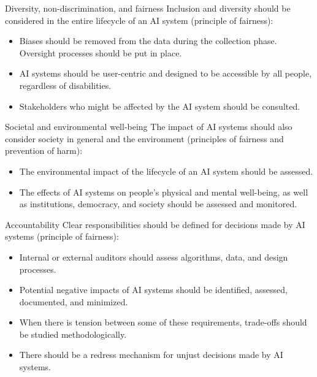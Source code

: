 \begin{descriptionlist}
    \item[Diversity, non-discrimination, and fairness] 
        Inclusion and diversity should be considered in the entire lifecycle of an AI system (principle of fairness):
        \begin{itemize}
            \item Biases should be removed from the data during the collection phase. Oversight processes should be put in place.
            \item AI systems should be user-centric and designed to be accessible by all people, regardless of disabilities.
            \item Stakeholders who might be affected by the AI system should be consulted.
        \end{itemize}



    \item[Societal and environmental well-being] 
        The impact of AI systems should also consider society in general and the environment (principles of fairness and prevention of harm):
        \begin{itemize}
            \item The environmental impact of the lifecycle of an AI system should be assessed.
            \item The effects of AI systems on people's physical and mental well-being, as well as institutions, democracy, and society should be assessed and monitored.
        \end{itemize}

    \item[Accountability] 
        Clear responsibilities should be defined for decisions made by AI systems (principle of fairness):
        \begin{itemize}
            \item Internal or external auditors should assess algorithms, data, and design processes.
            \item Potential negative impacts of AI systems should be identified, assessed, documented, and minimized.
            \item When there is tension between some of these requirements, trade-offs should be studied methodologically.
            \item There should be a redress mechanism for unjust decisions made by AI systems.
        \end{itemize}
\end{descriptionlist}

